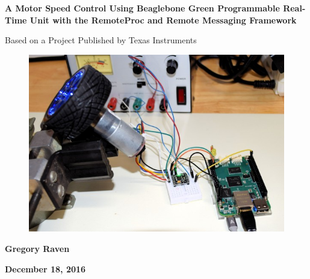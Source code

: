 \thispagestyle{empty}
{\centering\bfseries\color{black}\Huge
A Motor Speed Control Using Beaglebone Green Programmable Real-Time Unit with the RemoteProc and Remote Messaging Framework

Based on a Project Published by Texas Instruments
\par}

\bigskip

\begin{figure}
	\centering
	\includegraphics[width=\textwidth]{photos/intro_view}
\end{figure}

\bigskip
{\centering\bfseries\Large
Gregory Raven
\par}


\bigskip
{\centering\bfseries\LARGE
December 18, 2016
\par}



